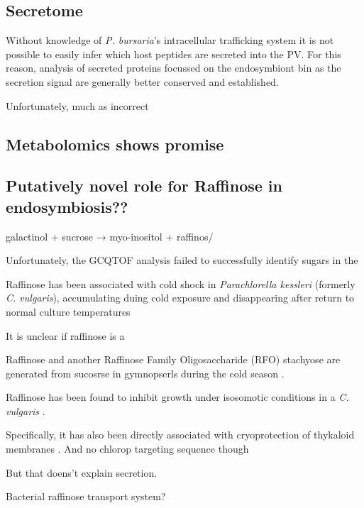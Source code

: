 \subsection{Secretome}
Without knowledge of \textit{P. bursaria}'s intracellular trafficking
system it is not possible to easily infer which host peptides are secreted into
the PV.  For this reason, analysis of secreted proteins focussed on 
the endosymbiont bin as the secretion signal are generally better conserved
and established. 

Unfortunately, much as incorrect




\subsection{Metabolomics shows promise}





\subsection{Putatively novel role for Raffinose in endosymbiosis??}

galactinol + sucrose → myo-inositol + raffinos/



Unfortunately, the GCQTOF analysis failed to successfully
identify sugars in the 


Raffinose has been associated with cold shock in
\textit{Parachlorella kessleri} (formerly \textit{C. vulgaris}),
accumulating duing cold exposure and disappearing after return
to normal culture temperatures 

It is unclear if raffinose is a 
\citep{Salerno1989}


Raffinose and another Raffinose Family Oligosaccharide (RFO) 
stachyose are generated from sucosrse in gymnopserls during
the cold season \citep{Kandler1982}.

Raffinose has been found to inhibit growth under
isosomotic conditions in a \textit{C. vulgaris} 
\citep{Setter1979}.

Specifically, it has also been directly associated
with cryoprotection of thykaloid membranes \citep{Lineberger1980}.
And no chlorop targeting sequence though

But that doens't explain secretion.



Bacterial raffinose transport system?


